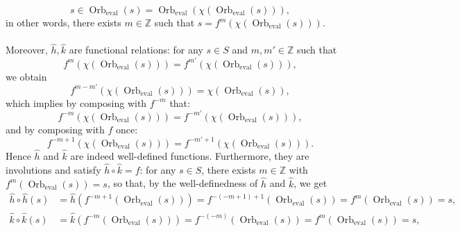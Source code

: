 \begin{solution}
    \[
        s \in \operatorname{Orb}_{\operatorname{eval}}\left(s\right) = \operatorname{Orb}_{\operatorname{eval}}\left( \chi\left( \operatorname{Orb}_{\operatorname{eval}}\left(s\right) \right) \right),
    \]
    in other words, there exists \( m \in \mathbb{Z} \) such that \( s = f^{m}\left( \chi\left( \operatorname{Orb}_{\operatorname{eval}}\left(s\right) \right) \right) \).
    \\\\
    Moreover, \( \hat{h},\hat{k} \) are functional relations: for any \( s \in S \) and \( m, m' \in \mathbb{Z} \) such that
    \[
        f^{m}\left( \chi\left( \operatorname{Orb}_{\operatorname{eval}}\left(s\right) \right) \right) = f^{m'}\left( \chi\left( \operatorname{Orb}_{\operatorname{eval}}\left(s\right) \right) \right),
    \]
    we obtain
    \[
        f^{m - m'}\left( \chi\left( \operatorname{Orb}_{\operatorname{eval}}\left(s\right) \right) \right) = \chi\left( \operatorname{Orb}_{\operatorname{eval}}\left(s\right) \right),
    \]
    which implies by composing with \( f^{-m} \) that:
    \[
        f^{-m}\left( \chi\left( \operatorname{Orb}_{\operatorname{eval}}\left(s\right) \right) \right) = f^{-m'}\left( \chi\left( \operatorname{Orb}_{\operatorname{eval}}\left(s\right) \right) \right),
    \]
    and by composing with \( f \) once:
    \[
        f^{-m + 1}\left( \chi\left( \operatorname{Orb}_{\operatorname{eval}}\left(s\right) \right) \right) = f^{-m' + 1}\left( \chi\left( \operatorname{Orb}_{\operatorname{eval}}\left(s\right) \right) \right).
    \]
    Hence \( \hat{h} \) and \( \hat{k} \) are indeed well-defined functions. Furthermore, they are involutions and satisfy \( \hat{h} \circ \hat{k} = f \): for any \( s \in S \), there exists \( m \in \mathbb{Z} \) with \( f^{m}\left( \operatorname{Orb}_{\operatorname{eval}}\left(s\right) \right) = s \), so that, by the well-definedness of \( \hat{h} \) and \( \hat{k} \), we get
    \begin{align*}
        \hat{h} \circ \hat{h}(s) &= \hat{h}\left( f^{-m+1}\left( \operatorname{Orb}_{\operatorname{eval}}(s) \right) \right) = f^{-(-m+1)+1}\left( \operatorname{Orb}_{\operatorname{eval}}(s) \right) = f^{m}\left( \operatorname{Orb}_{\operatorname{eval}}(s) \right) = s,
        \\
        \hat{k} \circ \hat{k}(s) &= \hat{k}\left( f^{-m}\left( \operatorname{Orb}_{\operatorname{eval}}(s) \right) \right) = f^{-(-m)}\left( \operatorname{Orb}_{\operatorname{eval}}(s) \right) = f^{m}\left( \operatorname{Orb}_{\operatorname{eval}}(s) \right) = s,
        \\

\end{align*}
\end{solution}
